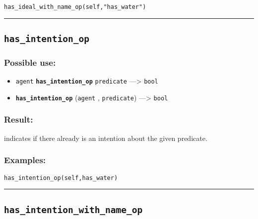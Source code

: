\documentclass[]{book}
\providecommand{\tightlist}{%
  \setlength{\itemsep}{0pt}\setlength{\parskip}{0pt}}
\theoremstyle{definition}
\theoremstyle{definition}
\theoremstyle{definition}
\theoremstyle{remark}
\begin{document}
\begin{verbatim}
has_ideal_with_name_op(self,"has_water") 
\end{verbatim}

\begin{center}\rule{0.5\linewidth}{\linethickness}\end{center}

\subsection{\texorpdfstring{\texttt{has\_intention\_op}}{has\_intention\_op}}\label{has_intention_op}

\subsubsection{Possible use:}\label{possible-use-252}

\begin{itemize}
\tightlist
\item
  \texttt{agent} \textbf{\texttt{has\_intention\_op}} \texttt{predicate}
  ---\textgreater{} \texttt{bool}
\item
  \textbf{\texttt{has\_intention\_op}} (\texttt{agent} ,
  \texttt{predicate}) ---\textgreater{} \texttt{bool}
\end{itemize}

\subsubsection{Result:}\label{result-243}

indicates if there already is an intention about the given predicate.

\subsubsection{Examples:}\label{examples-192}

\begin{verbatim}
has_intention_op(self,has_water) 
\end{verbatim}

\begin{center}\rule{0.5\linewidth}{\linethickness}\end{center}

\subsection{\texorpdfstring{\texttt{has\_intention\_with\_name\_op}}{has\_intention\_with\_name\_op}}\label{has_intention_with_name_op}
\end{document}
